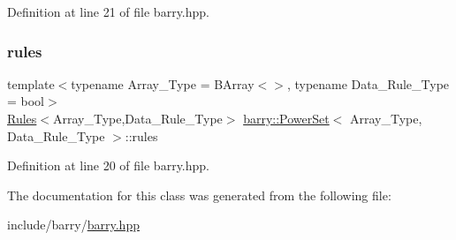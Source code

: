 Definition at line 21 of file barry.\+hpp.

\mbox{\label{classbarry_1_1_power_set_ad5486f771bb3161b951100192ce1b2e5}} 
\subsubsection{\texorpdfstring{rules}{rules}}
{\footnotesize\ttfamily template$<$typename Array\+\_\+\+Type  = B\+Array$<$$>$, typename Data\+\_\+\+Rule\+\_\+\+Type  = bool$>$ \\
\hyperlink{classbarry_1_1_rules}{Rules}$<$Array\+\_\+\+Type,Data\+\_\+\+Rule\+\_\+\+Type$>$ \hyperlink{classbarry_1_1_power_set}{barry\+::\+Power\+Set}$<$ Array\+\_\+\+Type, Data\+\_\+\+Rule\+\_\+\+Type $>$\+::rules}



Definition at line 20 of file barry.\+hpp.



The documentation for this class was generated from the following file\+:\begin{DoxyCompactItemize}
\item 
include/barry/\hyperlink{barry_8hpp}{barry.\+hpp}\end{DoxyCompactItemize}
